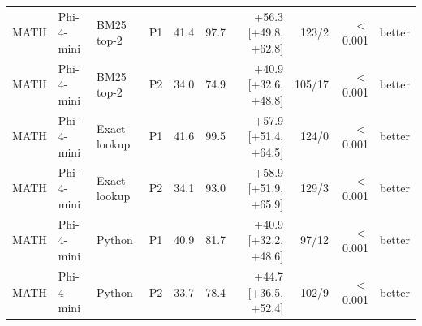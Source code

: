 \begin{tabular}{llll rrr rr l}
MATH & Phi-4-mini & BM25 top-2 & P1 & 41.4 & 97.7 & +56.3 [+49.8, +62.8] & 123/2 & $<$0.001 & better\\
MATH & Phi-4-mini & BM25 top-2 & P2 & 34.0 & 74.9 & +40.9 [+32.6, +48.8] & 105/17 & $<$0.001 & better\\
MATH & Phi-4-mini & Exact lookup & P1 & 41.6 & 99.5 & +57.9 [+51.4, +64.5] & 124/0 & $<$0.001 & better\\
MATH & Phi-4-mini & Exact lookup & P2 & 34.1 & 93.0 & +58.9 [+51.9, +65.9] & 129/3 & $<$0.001 & better\\
MATH & Phi-4-mini & Python & P1 & 40.9 & 81.7 & +40.9 [+32.2, +48.6] & 97/12 & $<$0.001 & better\\
MATH & Phi-4-mini & Python & P2 & 33.7 & 78.4 & +44.7 [+36.5, +52.4] & 102/9 & $<$0.001 & better\\
\bottomrule
\end{tabular}
